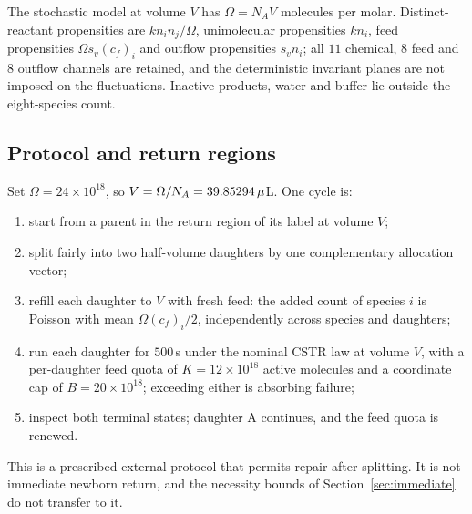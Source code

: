 The stochastic model at volume $V$ has $\Omega=N_AV$ molecules per molar. Distinct-reactant propensities are $kn_in_j/\Omega$, unimolecular propensities $kn_i$, feed propensities $\Omega s_v(c_f)_i$ and outflow propensities $s_vn_i$; all $11$ chemical, $8$ feed and $8$ outflow channels are retained, and the deterministic invariant planes are not imposed on the fluctuations. Inactive products, water and buffer lie outside the eight-species count.

\subsection{Protocol and return regions}\label{sec:semprotocol}
Set $\Omega=24\times10^{18}$, so $V=\Omega/N_A=39.85294\,\micro$L. One cycle is:
\begin{enumerate}
\item start from a parent in the return region of its label at volume $V$;
\item split fairly into two half-volume daughters by one complementary allocation vector;
\item refill each daughter to $V$ with fresh feed: the added count of species $i$ is Poisson with mean $\Omega(c_f)_i/2$, independently across species and daughters;
\item run each daughter for $500$\,s under the nominal CSTR law at volume $V$, with a per-daughter feed quota of $K=12\times10^{18}$ active molecules and a coordinate cap of $B=20\times10^{18}$; exceeding either is absorbing failure;
\item inspect both terminal states; daughter A continues, and the feed quota is renewed.
\end{enumerate}
This is a prescribed external protocol that permits repair after splitting. It is not immediate newborn return, and the necessity bounds of Section~\ref{sec:immediate} do not transfer to it.

